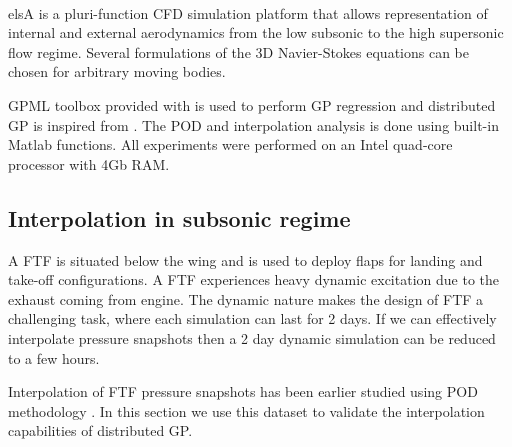 elsA\textsuperscript{\textregistered} \cite{cambier2008status} is a pluri-function CFD simulation platform that allows representation of internal and external aerodynamics from the low subsonic to the high supersonic flow regime. Several formulations of the 3D Navier-Stokes equations can be chosen for arbitrary moving bodies. 

GPML toolbox provided with \cite{rasmussen2006gaussian} is used to perform GP regression and distributed GP is inspired from \cite{deisenroth2015distributed}. The POD and interpolation analysis is done using built-in Matlab functions\cite{mathworks2005matlab}. All experiments were performed on an Intel quad-core processor with 4Gb RAM.

\subsection{Interpolation in subsonic regime}\label{subSec:elsAResults}
A FTF is situated below the wing and is used to deploy flaps for landing and take-off configurations. A FTF experiences heavy dynamic excitation due to the exhaust coming from engine. The dynamic nature makes the design of FTF a challenging task, where each simulation can last for 2 days. If we can effectively interpolate pressure snapshots then a 2 day dynamic simulation can be reduced to a few hours. 

Interpolation of FTF pressure snapshots has been earlier studied using POD methodology  \cite{bosco2016nonlinear}. In this section we use this dataset to validate the interpolation capabilities of distributed GP. 


